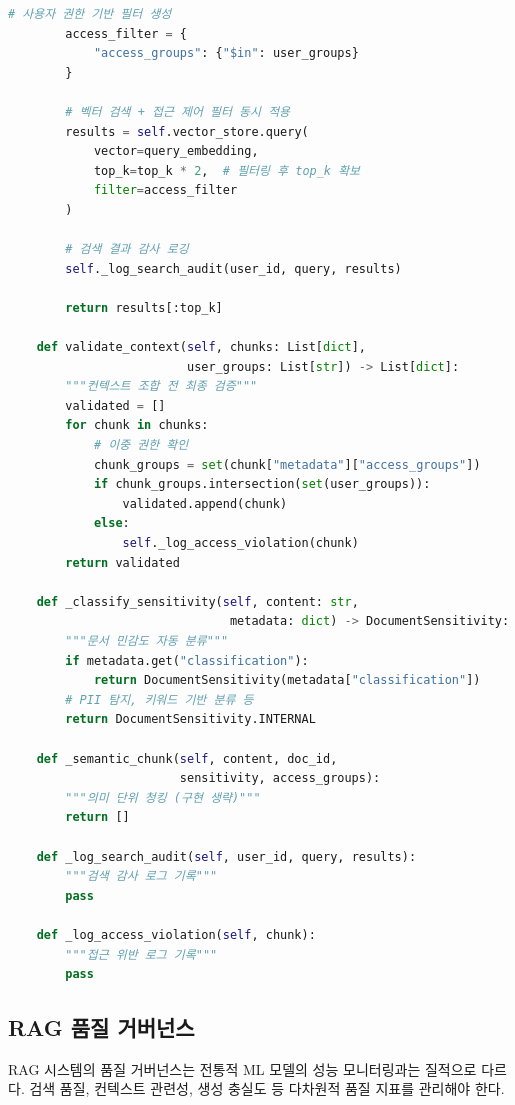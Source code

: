 \begin{lstlisting}[language=Python, caption={RAG 거버넌스 파이프라인 구현}, label={lst:rag_governance_pipeline}]
        # 사용자 권한 기반 필터 생성
        access_filter = {
            "access_groups": {"$in": user_groups}
        }

        # 벡터 검색 + 접근 제어 필터 동시 적용
        results = self.vector_store.query(
            vector=query_embedding,
            top_k=top_k * 2,  # 필터링 후 top_k 확보
            filter=access_filter
        )

        # 검색 결과 감사 로깅
        self._log_search_audit(user_id, query, results)

        return results[:top_k]

    def validate_context(self, chunks: List[dict],
                         user_groups: List[str]) -> List[dict]:
        """컨텍스트 조합 전 최종 검증"""
        validated = []
        for chunk in chunks:
            # 이중 권한 확인
            chunk_groups = set(chunk["metadata"]["access_groups"])
            if chunk_groups.intersection(set(user_groups)):
                validated.append(chunk)
            else:
                self._log_access_violation(chunk)
        return validated

    def _classify_sensitivity(self, content: str,
                               metadata: dict) -> DocumentSensitivity:
        """문서 민감도 자동 분류"""
        if metadata.get("classification"):
            return DocumentSensitivity(metadata["classification"])
        # PII 탐지, 키워드 기반 분류 등
        return DocumentSensitivity.INTERNAL

    def _semantic_chunk(self, content, doc_id,
                        sensitivity, access_groups):
        """의미 단위 청킹 (구현 생략)"""
        return []

    def _log_search_audit(self, user_id, query, results):
        """검색 감사 로그 기록"""
        pass

    def _log_access_violation(self, chunk):
        """접근 위반 로그 기록"""
        pass
\end{lstlisting}


\subsection{RAG 품질 거버넌스}
\label{sec:13.4.3}

RAG 시스템의 품질 거버넌스는 전통적 ML 모델의 성능 모니터링과는 질적으로 다르다. 검색 품질, 컨텍스트 관련성, 생성 충실도 등 다차원적 품질 지표를 관리해야 한다.

